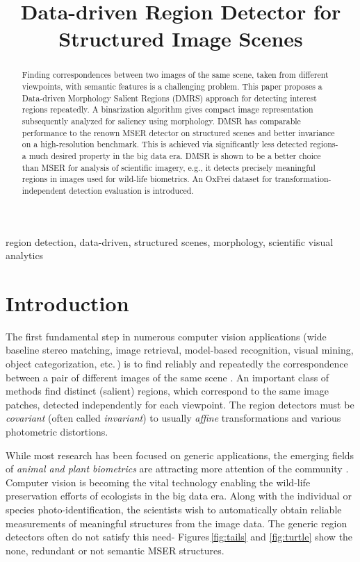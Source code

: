 \documentclass{article}
\title{Data-driven Region Detector for Structured Image Scenes}
\begin{document}
\maketitle

\begin{abstract}
Finding correspondences between two images of the same scene, taken from different viewpoints, with semantic features is a challenging problem.
This paper proposes a Data-driven Morphology Salient Regions (DMRS) approach for detecting interest regions repeatedly. 
A binarization algorithm gives compact image representation subsequently analyzed for saliency using morphology.
DMSR has comparable performance to the renown MSER detector on structured scenes and better invariance on a high-resolution benchmark. 
This is achieved via significantly less detected regions- a much desired property in the big data era. 
DMSR is shown to be a better choice than MSER for analysis of scientific imagery, e.g.,
it detects precisely meaningful regions in images used for wild-life biometrics.
An OxFrei dataset for transformation-independent detection evaluation is introduced.
\end{abstract}

\begin{keywords}
region detection, data-driven, structured scenes, morphology, scientific visual analytics
\end{keywords}

\section{Introduction}
\label{sec:intro}
The first fundamental step in numerous computer vision applications (wide baseline stereo matching, image retrieval, model-based recognition, visual mining, object categorization, etc.\,) is to find reliably and repeatedly the correspondence between a pair of different images of the same scene \cite{Matas2002BMVC, Rodriguez2013, EscaleraCVPR07}. An important class of methods find distinct (salient) regions, which correspond to the same image patches, detected independently for each viewpoint. The region detectors must be {\em covariant} (often called {\em invariant}) to usually {\em affine} transformations and various photometric distortions. 

While most research has been focused on generic applications, the emerging fields of {\em animal and plant biometrics} are attracting more attention of the community \cite{Kuehl2013, leafsnap_eccv2012}. Computer vision is becoming the vital technology enabling the wild-life preservation efforts of ecologists in the big data era. Along with the individual or species photo-identification, the scientists wish to automatically obtain reliable measurements of meaningful structures from the image data. The generic region detectors often do not satisfy this need- Figures\,\ref{fig:tails} and \ref{fig:turtle} show the none, redundant or not semantic MSER structures.
\end{document}
